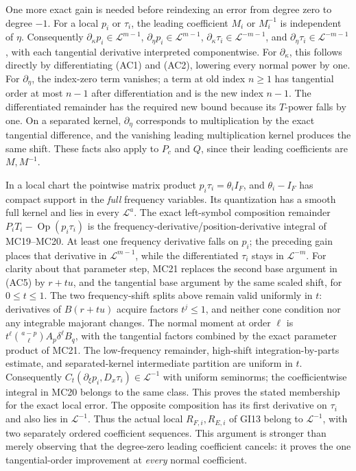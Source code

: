 \documentclass[
  11pt,
]{article}
\begin{document}
One more exact gain is needed before reindexing an error from degree
zero to degree \(-1\). For a local \(p_i\) or \(\tau_i\), the leading
coefficient \(M_i\) or \(M_i^{-1}\) is independent of \(\eta\).
Consequently \(\partial_\kappa p_i\in\mathcal L^{m-1}\),
\(\partial_\eta p_i\in\mathcal L^{m-1}\),
\(\partial_\kappa\tau_i\in\mathcal L^{-m-1}\), and
\(\partial_\eta\tau_i\in\mathcal L^{-m-1}\), with each tangential
derivative interpreted componentwise. For \(\partial_\kappa\), this
follows directly by differentiating (AC1) and (AC2), lowering every
normal power by one. For \(\partial_\eta\), the index-zero term
vanishes; a term at old index \(n\geq1\) has tangential order at most
\(n-1\) after differentiation and is the new index \(n-1\). The
differentiated remainder has the required new bound because its
\(T\)-power falls by one. On a separated kernel, \(\partial_\eta\)
corresponds to multiplication by the exact tangential difference, and
the vanishing leading multiplication kernel produces the same shift.
These facts also apply to \(P_c\) and \(Q\), since their leading
coefficients are \(M,M^{-1}\).

In a local chart the pointwise matrix product
\(p_i\tau_i=\theta_i I_F\), and \(\theta_i-I_F\) has compact support in
the \emph{full} frequency variables. Its quantization has a smooth full
kernel and lies in every \(\mathcal L^a\). The exact left-symbol
composition remainder \(P_iT_i-\operatorname{Op}(p_i\tau_i)\) is the
frequency-derivative/position-derivative integral of MC19--MC20. At
least one frequency derivative falls on \(p_i\); the preceding gain
places that derivative in \(\mathcal L^{m-1}\), while the differentiated
\(\tau_i\) stays in \(\mathcal L^{-m}\). For clarity about that
parameter step, MC21 replaces the second base argument in (AC5) by
\(r+t u\), and the tangential base argument by the same scaled shift,
for \(0\leq t\leq1\). The two frequency-shift splits above remain valid
uniformly in \(t\): derivatives of \(B(r+t u)\) acquire factors
\(t^j\leq1\), and neither cone condition nor any integrable majorant
changes. The normal moment at order \(\ell\) is
\(t^\ell\binom{a-p}{\ell}A_p\delta^\ell B_q\), with the tangential
factors combined by the exact parameter product of MC21. The
low-frequency remainder, high-shift integration-by-parts estimate, and
separated-kernel intermediate partition are uniform in \(t\).
Consequently \(C_t(\partial_\xi p_i,D_x\tau_i)\in\mathcal L^{-1}\) with
uniform seminorms; the coefficientwise integral in MC20 belongs to the
same class. This proves the stated membership for the exact local error.
The opposite composition has its first derivative on \(\tau_i\) and also
lies in \(\mathcal L^{-1}\). Thus the actual local \(R_{F,i},R_{E,i}\)
of GI13 belong to \(\mathcal L^{-1}\), with two separately ordered
coefficient sequences. This argument is stronger than merely observing
that the degree-zero leading coefficient cancels: it proves the one
tangential-order improvement at \emph{every} normal coefficient.
\end{document}

